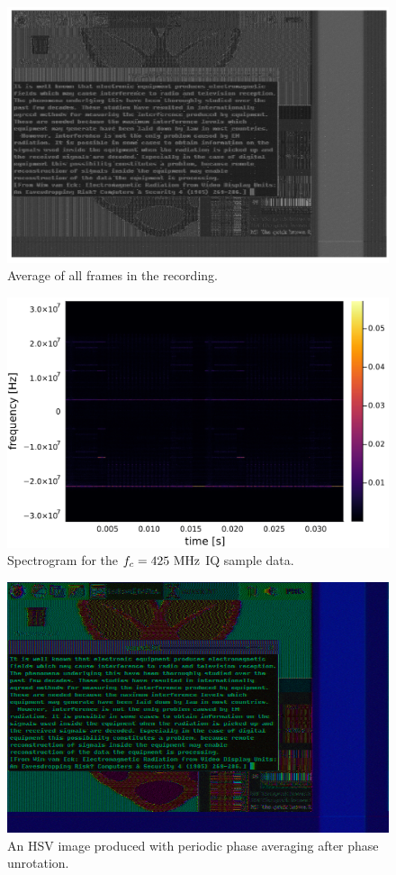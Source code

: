 \documentclass{article}
\begin{document}
\begin{figure}
    \centering
    \includegraphics[width=0.8\linewidth]{images/grayscale_averaged.png}
    \caption{Average of all frames in the recording.}
    \label{fig:grayscale-averaged}
\end{figure}

\begin{figure}
    \centering
    \includegraphics[width=\linewidth]{images/periodic_phase_spectrogram_425.png}
    \caption{Spectrogram for the $f_c = \textnormal{425 MHz}$ IQ sample data.}
    \label{fig:periodic-phase-spectrogram}
\end{figure}

\begin{figure}
    \centering
    \includegraphics[width=\linewidth]{images/periodic_phase_averaging.png}
    \caption{An HSV image produced with periodic phase averaging after phase unrotation.}
    \label{fig:periodic-phase-averaging}
\end{figure}
\end{document}
